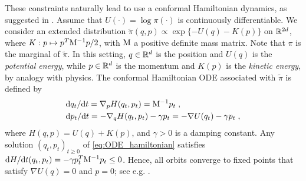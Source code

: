 \documentclass{article}
\begin{document}
These constraints naturally lead to use a  conformal Hamiltonian dynamics, as suggested in
\cite{rotskoff:vanden-eijden:2019}.  Assume that $U(\cdot) = \log \pi(\cdot)$ is continuously differentiable. We consider an extended distribution $\tilde\pi(q,p) \propto \exp \{-U(q)-K(p)\}$
on  $\mathbb{R}^{2d}$, where $K:p\mapsto p^T\mathrm{M}^{-1} p/2$, with $\mathrm{M}$ a positive definite mass matrix. Note that $\pi$ is the marginal of $\tilde{\pi}$. In this setting, $q\in \mathbb{R}^d$ is the position and $U(q)$ is the {\em potential energy}, while $p\in \mathbb{R}^d$ is the momentum and $K(p)$ is the {\em kinetic energy}, by analogy with physics. The conformal Hamiltonian ODE associated with $\tilde \pi$ is defined by %
\begin{align}
  \label{eq:ODE_hamiltonian}
  &\mathrm{d}{q_t}/\mathrm{d} t =\nabla_{p} H(q_t,p_t) = \mathrm{M}^{-1} p_t \;, \\
  \nonumber
&\mathrm{d} {p}_t/\mathrm{d} t =-\nabla_{q} H(q_t,p_t)-\gamma p_t = -\nabla U(q_t) - \gamma p_t \;,
\end{align}
where $H(q,p)= U(q)+ K(p)$, and $\gamma >0$ is a damping constant.
Any solution $(q_t,p_t)_{t \geq 0}$ of \eqref{eq:ODE_hamiltonian} satisfies $\mathrm{d} {H}/\mathrm{d} t (q_t,p_t) = - \gamma p_t^T\mathrm{M}^{-1} p_t\leq 0$. Hence, all orbits converge to fixed points that satisfy $\nabla U(q)=0$ and $p=0$; see e.g. \citep{francca2019conformal,maddison2018hamiltonian}.
\end{document}
